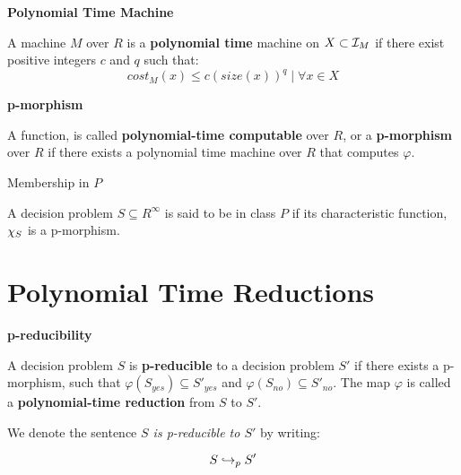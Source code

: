 \begin{definition}{\textbf{Polynomial Time Machine}}

  A machine $M$ over $R$ is a \textbf{polynomial time} machine on $X
  \subset \mathcal{I}_M$ if there exist positive integers $c$ and $q$
  such that:
  $$cost_M(x) \leq c(size(x))^q \mid \forall x \in X$$
\end{definition}

\begin{definition}{\textbf{p-morphism}}
  
  A function,  is called
  \textbf{polynomial-time computable} over $R$, or a
  \textbf{p-morphism} over $R$ if there exists a polynomial time
  machine over $R$ that computes $\varphi$.

\end{definition}


\begin{definition}{Membership in $P$}

  A decision problem $S \subseteq R^\infty$ is said to be in class $P$
  if its characteristic function, $\chi_S$ is a p-morphism.
\end{definition}

\section{Polynomial Time Reductions}

\begin{definition}{\textbf{p-reducibility}}

  A decision problem $S$ is \textbf{p-reducible} to a decision problem
  $S'$ if there exists a p-morphism,
   such that $\varphi(S_{yes})
  \subseteq S'_{yes}$ and $\varphi(S_{no}) \subseteq S'_{no}$.  The
  map $\varphi$ is called a \textbf{polynomial-time reduction} from
  $S$ to $S'$.

  We denote the sentence \emph{$S$ is p-reducible to $S'$} by writing:

  $$S \hookrightarrow_p S'$$
  \end{definition}


